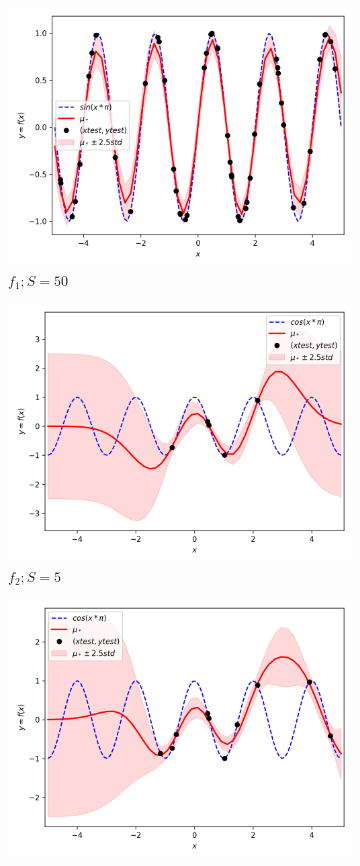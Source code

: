 \documentclass{article}
\begin{document}
\begin{figure}
\begin{subfigure}{.33\textwidth}
  \includegraphics[width=\linewidth]{train_size/func1_50.png}
  \caption{$f_1; S = 50$}
\end{subfigure}
\begin{subfigure}{.33\textwidth}
  \centering
  \includegraphics[width=\linewidth]{train_size/func2_5.png}
  \caption{$f_2; S = 5$}
\end{subfigure}
\begin{subfigure}{.33\textwidth}
  \centering
  \includegraphics[width=\linewidth]{train_size/func2_10.png}

\end{subfigure}
\end{figure}
\end{document}
